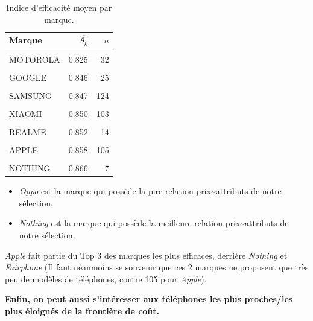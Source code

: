 \documentclass[
  12pt,
]{report}
\providecommand{\tightlist}{%
  \setlength{\itemsep}{0pt}\setlength{\parskip}{0pt}}\usepackage{longtable,booktabs,array}
\begin{document}
\begin{table}[!h]

\caption{\label{tab:eff_brands}Indice d'efficacité moyen par marque.}
\centering
\begin{tabular}[t]{lrr}
\toprule
\textbf{Marque} & \textbf{$\hat{\theta_k}$} & \textbf{$n$}\\
\midrule
\cellcolor{gray!6}{OPPO} & \cellcolor{gray!6}{0.817} & \cellcolor{gray!6}{17}\\
MOTOROLA & 0.825 & 32\\
\cellcolor{gray!6}{HONOR} & \cellcolor{gray!6}{0.842} & \cellcolor{gray!6}{14}\\
GOOGLE & 0.846 & 25\\
\cellcolor{gray!6}{ASUS} & \cellcolor{gray!6}{0.847} & \cellcolor{gray!6}{12}\\
\addlinespace
SAMSUNG & 0.847 & 124\\
\cellcolor{gray!6}{VIVO} & \cellcolor{gray!6}{0.850} & \cellcolor{gray!6}{9}\\
XIAOMI & 0.850 & 103\\
\cellcolor{gray!6}{ONEPLUS} & \cellcolor{gray!6}{0.852} & \cellcolor{gray!6}{7}\\
REALME & 0.852 & 14\\
\addlinespace
\cellcolor{gray!6}{SONY} & \cellcolor{gray!6}{0.855} & \cellcolor{gray!6}{15}\\
APPLE & 0.858 & 105\\
\cellcolor{gray!6}{FAIRPHONE} & \cellcolor{gray!6}{0.864} & \cellcolor{gray!6}{3}\\
NOTHING & 0.866 & 7\\
\bottomrule
\end{tabular}
\end{table}

\begin{itemize}
\tightlist
\item
  \emph{Oppo} est la marque qui possède la pire relation
  prix\textasciitilde attributs de notre sélection.
\item
  \emph{Nothing} est la marque qui possède la meilleure relation
  prix\textasciitilde attributs de notre sélection.
\end{itemize}

\emph{Apple} fait partie du Top 3 des marques les plus efficaces,
derrière \emph{Nothing} et \emph{Fairphone} (Il faut néanmoins se
souvenir que ces 2 marques ne proposent que très peu de modèles de
téléphones, contre 105 pour \emph{Apple}).

\textbf{Enfin, on peut aussi s'intéresser aux téléphones les plus
proches/les plus éloignés de la frontière de coût.}
\end{document}
